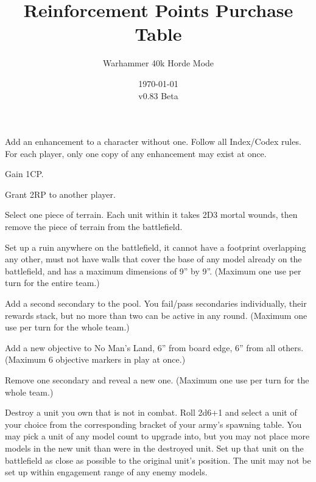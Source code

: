 \documentclass{HordeModeTarot}
\title{Reinforcement Points Purchase Table}
\author{Warhammer 40k Horde Mode}
\date{\today \\v0.83 Beta}
\begin{document}
\maketitle


Add an enhancement to a character without one. Follow all Index/Codex rules. For each player, only one copy of any enhancement may exist at once.


Gain 1CP.


Grant 2RP to another player.


Select one piece of terrain. Each unit within it takes 2D3 mortal wounds, then remove the piece of terrain from the battlefield.


Set up a ruin anywhere on the battlefield, it cannot have a footprint overlapping any other, must not have walls that cover the base of any model already on the battlefield, and has a maximum dimensions of 9'' by 9''. (Maximum one use per turn for the entire team.)


Add a second secondary to the pool.  You fail/pass secondaries individually, their rewards stack, but no more than two can be active in any round. (Maximum one use per turn for the whole team.)


Add a new objective to No Man's Land, 6'' from board edge, 6'' from all others. (Maximum 6 objective markers in play at once.)


Remove one secondary and reveal a new one. (Maximum one use per turn for the whole team.)


Destroy a unit you own that is not in combat. Roll 2d6+1 and select a unit of your choice from the corresponding bracket of your army's spawning table. You may pick a unit of any model count to upgrade into, but you may not place more models in the new unit than were in the destroyed unit. Set up that unit on the battlefield as close as possible to the original unit's position. The unit may not be set up within engagement range of any enemy models.
\end{document}

